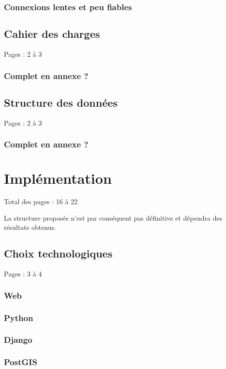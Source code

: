 \documentclass{eplmastersthesis_FR}
\begin{document}
			\subsection*{Connexions lentes et peu fiables}

		\section{Cahier des charges}

			Pages : 2 à 3

			\subsection*{Complet en annexe ?}

		\section{Structure des données}

			Pages : 2 à 3

			\subsection*{Complet en annexe ?}

	\chapter{Implémentation}

		Total des pages : 16 à 22

		La structure proposée n'est par conséquent pas définitive et dépendra des résultats obtenus.

		\section{Choix technologiques}

			Pages : 3 à 4

			\subsection*{Web}
			\subsection*{Python}
			\subsection*{Django}
			\subsection*{PostGIS}
\end{document}
